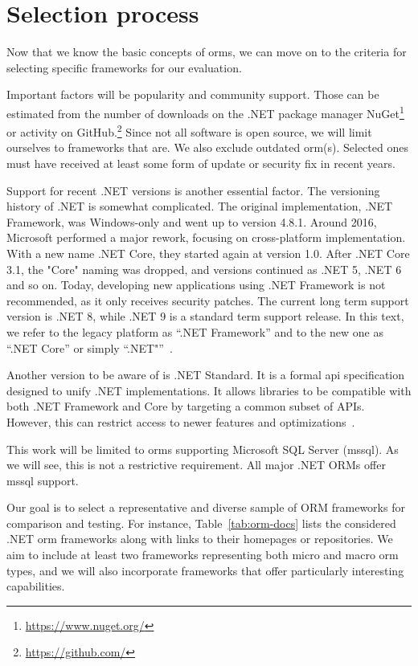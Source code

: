 \section{Selection process}
Now that we know the basic concepts of \acrshort{orm}s, we can move on to the criteria for selecting specific frameworks for our evaluation.

Important factors will be popularity and community support. Those can be estimated from the number of downloads on the .NET package manager NuGet\footnote{\url{https://www.nuget.org/}} or activity on GitHub.\footnote{\url{https://github.com/}} Since not all software is open source, we will limit ourselves to frameworks that are. We also  exclude outdated \acrshort{orm}(s). Selected ones must have received at least some form of update or security fix in recent years.

Support for recent .NET versions is another essential factor. The versioning history of .NET is somewhat complicated. The original implementation, .NET Framework, was Windows-only and went up to version 4.8.1. Around 2016, Microsoft performed a major rework, focusing on cross-platform implementation. With a new name .NET Core, they started again at version 1.0. After .NET Core 3.1, the "Core" naming was dropped, and versions continued as .NET 5, .NET 6 and so on. Today, developing new applications using .NET Framework is not recommended, as it only receives security patches. The current long term support version is .NET 8, while .NET 9 is a standard term support release. In this text, we refer to the legacy platform as ``.NET Framework'' and to the new one as ``.NET Core'' or simply ``.NET"''~\cite{NETFrameworkVersions,NETversions}.

Another version to be aware of is .NET Standard. It is a formal \acrshort{api} specification designed to unify .NET implementations. It allows libraries to be compatible with both .NET Framework and Core by targeting a common subset of APIs. However, this can restrict access to newer features and optimizations~\cite{NETStandard}.

This work will be limited to \acrshort{orm}s supporting Microsoft SQL Server (\acrshort{mssql}). As we will see, this is not a restrictive requirement. All major .NET ORMs offer \acrshort{mssql} support.

Our goal is to select a representative and diverse sample of \acrshort{ORM} frameworks for comparison and testing. For instance, Table~\ref{tab:orm-docs} lists the considered .NET \acrshort{orm} frameworks along with links to their homepages or repositories. We aim to include at least two frameworks representing both micro and macro \acrshort{orm} types, and we will also incorporate frameworks that offer particularly interesting capabilities.

